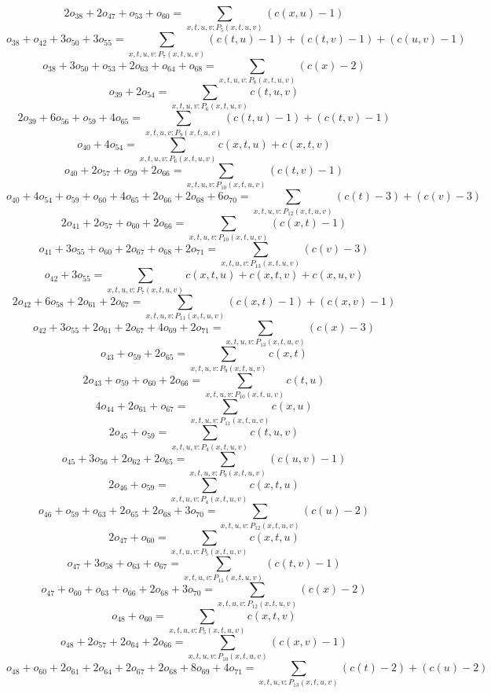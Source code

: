 \[2o_{38} + 2o_{47} + o_{53} + o_{60} = \sum\limits_{x,t,u,v:P_{5} (x,t,u,v)} ( c( x, u ) - 1 ) \]
\[o_{38} + o_{42} + 3o_{50} + 3o_{55} = \sum\limits_{x,t,u,v:P_{7} (x,t,u,v)} ( c( t, u ) - 1 ) + ( c( t, v ) - 1 ) + ( c( u, v ) - 1 ) \]
\[o_{38} + 3o_{50} + o_{53} + 2o_{63} + o_{64} + o_{68} = \sum\limits_{x,t,u,v:P_{8} (x,t,u,v)} ( c( x ) - 2 ) \]
\[o_{39} + 2o_{54} = \sum\limits_{x,t,u,v:P_{6} (x,t,u,v)} c( t, u, v ) \]
\[2o_{39} + 6o_{56} + o_{59} + 4o_{65} = \sum\limits_{x,t,u,v:P_{9} (x,t,u,v)} ( c( t, u ) - 1 ) + ( c( t, v ) - 1 ) \]
\[o_{40} + 4o_{54} = \sum\limits_{x,t,u,v:P_{6} (x,t,u,v)} c( x, t, u ) + c( x, t, v ) \]
\[o_{40} + 2o_{57} + o_{59} + 2o_{66} = \sum\limits_{x,t,u,v:P_{10} (x,t,u,v)} ( c( t, v ) - 1 ) \]
\[o_{40} + 4o_{54} + o_{59} + o_{60} + 4o_{65} + 2o_{66} + 2o_{68} + 6o_{70} = \sum\limits_{x,t,u,v:P_{12} (x,t,u,v)} ( c( t ) - 3 ) + ( c( v ) - 3 ) \]
\[2o_{41} + 2o_{57} + o_{60} + 2o_{66} = \sum\limits_{x,t,u,v:P_{10} (x,t,u,v)} ( c( x, t ) - 1 ) \]
\[o_{41} + 3o_{55} + o_{60} + 2o_{67} + o_{68} + 2o_{71} = \sum\limits_{x,t,u,v:P_{13} (x,t,u,v)} ( c( v ) - 3 ) \]
\[o_{42} + 3o_{55} = \sum\limits_{x,t,u,v:P_{7} (x,t,u,v)} c( x, t, u ) + c( x, t, v ) + c( x, u, v ) \]
\[2o_{42} + 6o_{58} + 2o_{61} + 2o_{67} = \sum\limits_{x,t,u,v:P_{11} (x,t,u,v)} ( c( x, t ) - 1 ) + ( c( x, v ) - 1 ) \]
\[o_{42} + 3o_{55} + 2o_{61} + 2o_{67} + 4o_{69} + 2o_{71} = \sum\limits_{x,t,u,v:P_{13} (x,t,u,v)} ( c( x ) - 3 ) \]
\[o_{43} + o_{59} + 2o_{65} = \sum\limits_{x,t,u,v:P_{9} (x,t,u,v)} c( x, t ) \]
\[2o_{43} + o_{59} + o_{60} + 2o_{66} = \sum\limits_{x,t,u,v:P_{10} (x,t,u,v)} c( t, u ) \]
\[4o_{44} + 2o_{61} + o_{67} = \sum\limits_{x,t,u,v:P_{11} (x,t,u,v)} c( x, u ) \]
\[2o_{45} + o_{59} = \sum\limits_{x,t,u,v:P_{4} (x,t,u,v)} c( t, u, v ) \]
\[o_{45} + 3o_{56} + 2o_{62} + 2o_{65} = \sum\limits_{x,t,u,v:P_{9} (x,t,u,v)} ( c( u, v ) - 1 ) \]
\[2o_{46} + o_{59} = \sum\limits_{x,t,u,v:P_{4} (x,t,u,v)} c( x, t, u ) \]
\[o_{46} + o_{59} + o_{63} + 2o_{65} + 2o_{68} + 3o_{70} = \sum\limits_{x,t,u,v:P_{12} (x,t,u,v)} ( c( u ) - 2 ) \]
\[2o_{47} + o_{60} = \sum\limits_{x,t,u,v:P_{5} (x,t,u,v)} c( x, t, u ) \]
\[o_{47} + 3o_{58} + o_{63} + o_{67} = \sum\limits_{x,t,u,v:P_{11} (x,t,u,v)} ( c( t, v ) - 1 ) \]
\[o_{47} + o_{60} + o_{63} + o_{66} + 2o_{68} + 3o_{70} = \sum\limits_{x,t,u,v:P_{12} (x,t,u,v)} ( c( x ) - 2 ) \]
\[o_{48} + o_{60} = \sum\limits_{x,t,u,v:P_{5} (x,t,u,v)} c( x, t, v ) \]
\[o_{48} + 2o_{57} + 2o_{64} + 2o_{66} = \sum\limits_{x,t,u,v:P_{10} (x,t,u,v)} ( c( x, v ) - 1 ) \]
\[o_{48} + o_{60} + 2o_{61} + 2o_{64} + 2o_{67} + 2o_{68} + 8o_{69} + 4o_{71} = \sum\limits_{x,t,u,v:P_{13} (x,t,u,v)} ( c( t ) - 2 ) + ( c( u ) - 2 ) \]
